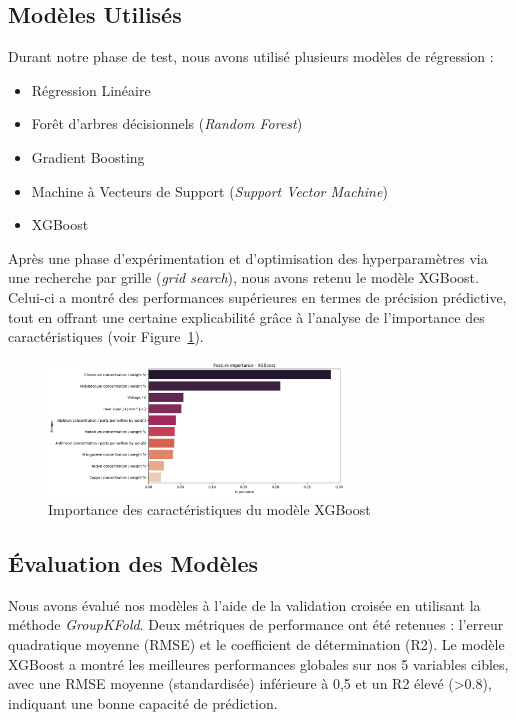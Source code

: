\documentclass{article}
\begin{document}
\subsection{Modèles Utilisés}

Durant notre phase de test, nous avons utilisé plusieurs modèles de régression :

\begin{itemize}
\item Régression Linéaire
\item Forêt d’arbres décisionnels (\textit{Random Forest})
\item Gradient Boosting
\item Machine à Vecteurs de Support (\textit{Support Vector Machine})
\item XGBoost
\end{itemize}

Après une phase d’expérimentation et d’optimisation des hyperparamètres via une recherche par grille (\textit{grid search}), nous avons retenu le modèle XGBoost. Celui-ci a montré des performances supérieures en termes de précision prédictive, tout en offrant une certaine explicabilité grâce à l’analyse de l’importance des caractéristiques (voir Figure~\ref{fig:xgboost_feature_importance}).

\begin{figure}[H]
    \centering
    \includegraphics[width=0.7\textwidth]{images/xgboost_feature_importance.png}
    \caption{Importance des caractéristiques du modèle XGBoost}
    \label{fig:xgboost_feature_importance}
\end{figure}

\subsection{Évaluation des Modèles}

Nous avons évalué nos modèles à l’aide de la validation croisée en utilisant la méthode \textit{GroupKFold}. Deux métriques de performance ont été retenues : l’erreur quadratique moyenne (RMSE) et le coefficient de détermination (R2). Le modèle XGBoost a montré les meilleures performances globales sur nos 5 variables cibles, avec une RMSE moyenne (standardisée) inférieure à 0,5 et un R2 élevé (>0.8), indiquant une bonne capacité de prédiction.
\end{document}
